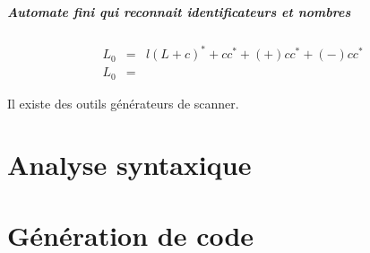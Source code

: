 \documentclass[12pt,a4paper,openany]{book}
\begin{document}
	\begin{exemple}
		\paragraph{Automate fini qui reconnait identificateurs et nombres}
		\begin{eqnarray*}
			L_0 &=&  l(L+c)^* + cc^* + (+) cc^* +(-)cc^*\\
			L_0 &=& 
		\end{eqnarray*}
	\end{exemple}

	Il existe des outils générateurs de scanner.
	\chapter{Analyse syntaxique}
	\chapter{Génération de code}
\end{document}

